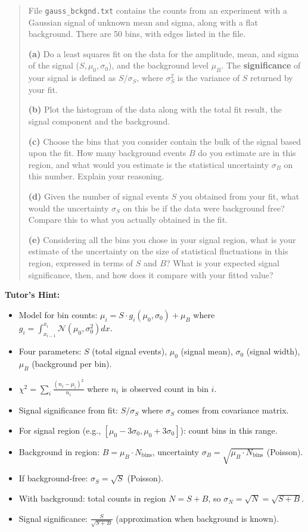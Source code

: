 \documentclass[11pt]{article}
\begin{document}
\begin{quote}
    File \texttt{gauss\_bckgnd.txt} contains the counts from an experiment with a Gaussian signal of unknown mean and sigma, along with a flat background. There are 50 bins, with edges listed in the file.

    \textbf{(a)} Do a least squares fit on the data for the amplitude, mean, and sigma of the signal ($S, \mu_0, \sigma_0$), and the background level $\mu_B$. The \textbf{significance} of your signal is defined as $S/\sigma_S$, where $\sigma_S^2$ is the variance of $S$ returned by your fit.

    \textbf{(b)} Plot the histogram of the data along with the total fit result, the signal component and the background.

    \textbf{(c)} Choose the bins that you consider contain the bulk of the signal based upon the fit. How many background events $B$ do you estimate are in this region, and what would you estimate is the statistical uncertainty $\sigma_B$ on this number. Explain your reasoning.

    \textbf{(d)} Given the number of signal events $S$ you obtained from your fit, what would the uncertainty $\sigma_S$ on this be if the data were background free? Compare this to what you actually obtained in the fit.

    \textbf{(e)} Considering all the bins you chose in your signal region, what is your estimate of the uncertainty on the size of statistical fluctuations in this region, expressed in terms of $S$ and $B$? What is your expected signal significance, then, and how does it compare with your fitted value?
\end{quote}

\textbf{Tutor's Hint:}
\begin{itemize}
    \item Model for bin counts: $\mu_i = S \cdot g_i(\mu_0, \sigma_0) + \mu_B$ where $g_i = \int_{x_{i-1}}^{x_i} \mathcal{N}(\mu_0, \sigma_0^2) dx$.
    \item Four parameters: $S$ (total signal events), $\mu_0$ (signal mean), $\sigma_0$ (signal width), $\mu_B$ (background per bin).
    \item $\chi^2 = \sum_i \frac{(n_i - \mu_i)^2}{n_i}$ where $n_i$ is observed count in bin $i$.
    \item Signal significance from fit: $S/\sigma_S$ where $\sigma_S$ comes from covariance matrix.
    \item For signal region (e.g., $[\mu_0 - 3\sigma_0, \mu_0 + 3\sigma_0]$): count bins in this range.
    \item Background in region: $B = \mu_B \cdot N_{\text{bins}}$, uncertainty $\sigma_B = \sqrt{\mu_B \cdot N_{\text{bins}}}$ (Poisson).
    \item If background-free: $\sigma_S = \sqrt{S}$ (Poisson).
    \item With background: total counts in region $N = S + B$, so $\sigma_N = \sqrt{N} = \sqrt{S + B}$.
    \item Signal significance: $\frac{S}{\sqrt{S + B}}$ (approximation when background is known).
\end{itemize}
\end{document}
